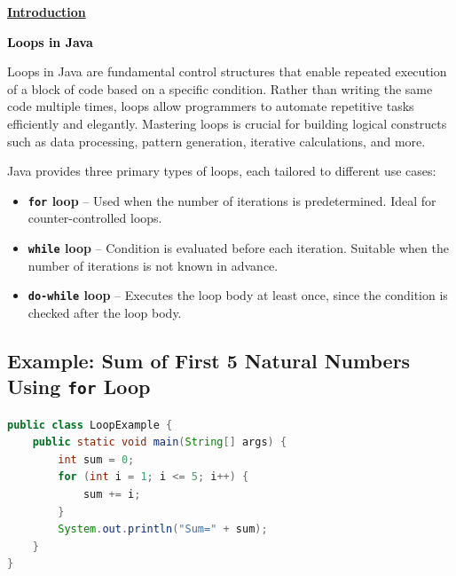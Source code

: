 \documentclass{article}
\begin{document}
\begin{center}
    {\LARGE\underline{\textbf{Introduction}}}
\end{center}
\Large{}


\newpage
\begin{center}
    \Huge\bfseries \textcolor{black}{Loops in Java}
\end{center}
\vspace{0.5cm}

\noindent
Loops in Java are fundamental control structures that enable repeated execution of a block of code based on a specific condition. Rather than writing the same code multiple times, loops allow programmers to automate repetitive tasks efficiently and elegantly. Mastering loops is crucial for building logical constructs such as data processing, pattern generation, iterative calculations, and more.

Java provides three primary types of loops, each tailored to different use cases:

\vspace{0.5cm}

\begin{tcolorbox}[colback=black!5!white,colframe=black,title=\textbf{Types of Loops in Java}]
\begin{itemize}[leftmargin=2em]
    \item \textbf{\texttt{for} loop} – Used when the number of iterations is predetermined. Ideal for counter-controlled loops.
    \item \textbf{\texttt{while} loop} – Condition is evaluated before each iteration. Suitable when the number of iterations is not known in advance.
    \item \textbf{\texttt{do-while} loop} – Executes the loop body at least once, since the condition is checked after the loop body.
\end{itemize}
\end{tcolorbox}

\vspace{0.5cm}

\subsection*{Example: Sum of First 5 Natural Numbers Using \texttt{for} Loop}
\begin{lstlisting}[language=Java,caption=Java Program to Find Sum of First 5 Natural Numbers,label=lst:sumForLoop]
public class LoopExample {
    public static void main(String[] args) {
        int sum = 0;
        for (int i = 1; i <= 5; i++) {
            sum += i;
        }
        System.out.println("Sum=" + sum);
    }
}
\end{lstlisting}
\end{document}

